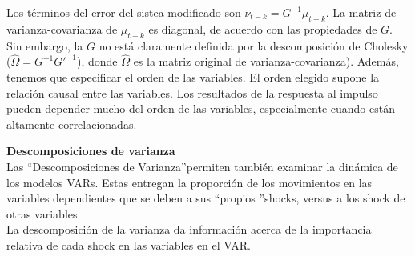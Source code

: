 Los términos del error del sistea modificado son $\nu_{t-k}=G^{-1}\mu_{t-k}$. La matriz de varianza-covarianza de $\mu_{t-k}$ es diagonal, de acuerdo con las propiedades de $G$. Sin embargo, la $G$ no est\'a claramente definida por la descomposici\'on de Cholesky ($\hat{\Omega}=G^{-1}G'^{-1}$), donde $\hat{\Omega}$ es la matriz original de varianza-covarianza). Adem\'as, tenemos que especificar el orden de las variables. El orden elegido supone la relaci\'on causal entre las variables. Los resultados de la respuesta al impulso pueden depender mucho del orden de las variables, especialmente cuando est\'an altamente correlacionadas. 
	
\textbf{Descomposiciones de varianza}\\
	Las \textquotedblleft Descomposiciones de Varianza\textquotedblright permiten tambi\'en examinar la din\'amica de los modelos VARs. Estas entregan la proporci\'on de los movimientos en las variables dependientes que se deben a sus \textquotedblleft propios \textquotedblright shocks, versus a los shock de otras variables.\\
	
	La descomposici\'on de la varianza da informaci\'on acerca de la importancia relativa de cada shock en las variables en el VAR.
	
	
	
